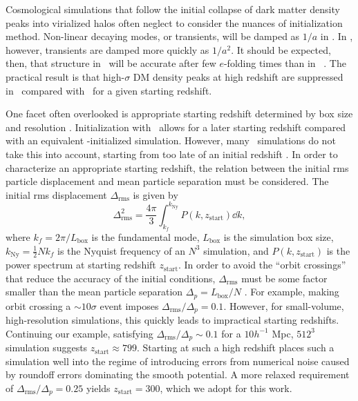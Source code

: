 

Cosmological simulations that follow the initial collapse of dark matter density peaks into virialized halos often neglect to consider the nuances of initialization method.  Non-linear decaying modes, or transients, will be damped as $1 / a$ in \za.  In \lpt, however, transients are damped more quickly as $1 / a^{2}$.  It should be expected, then, that structure in \lpt\ will be accurate after few $e$-folding times than in \za\ \citep{1998MNRAS.299.1097S, 2006MNRAS.373..369C, 2010MNRAS.403.1859J}.  The practical result is that high-$\sigma$ DM density peaks at high redshift are suppressed in \za\ compared with \lpt\ for a given starting redshift.

One facet often overlooked is appropriate starting redshift determined by box size and resolution \citep{2007ApJ...671.1160L}.  Initialization with \lpt\ allows for a later starting redshift compared with an equivalent \za-initialized simulation.  However, many \za\ simulations do not take this into account, starting from too late of an initial redshift \citep{2006MNRAS.373..369C, 2010MNRAS.403.1859J}.  In order to characterize an appropriate starting redshift, the relation between the initial rms particle displacement and mean particle separation must be considered.  The initial rms displacement $\Delta_{\mathrm{rms}}$ is given by
\begin{equation}
	\Delta_{\mathrm{rms}}^{2} = \frac{4 \pi}{3} \int_{k_{f}}^{k_{\mathrm{Ny}}} P(k, z_{\mathrm{start}}) \dd k,
\end{equation}
where $k_{f} = 2 \pi / L_{\mathrm{box}}$ is the fundamental mode, $L_{\mathrm{box}}$ is the simulation box size, $k_{\mathrm{Ny}} = \frac{1}{2} N k_{f}$ is the Nyquist frequency of an $N^{3}$ simulation, and $P(k, z_{\mathrm{start}})$ is the power spectrum at starting redshift $z_{\mathrm{start}}$.  In order to avoid the ``orbit crossings'' that reduce the accuracy of the initial conditions, $\Delta_{\mathrm{rms}}$ must be some factor smaller than the mean particle separation $\Delta_{p} = L_{\mathrm{box}} / N$ \citep{2012ApJ...761L...8H}.  For example, making orbit crossing a $\sim 10 \sigma$ event imposes $\Delta_{\mathrm{rms}} / \Delta_{p} = 0.1$.  However, for small-volume, high-resolution simulations, this quickly leads to impractical starting redshifts.  Continuing our example, satisfying $\Delta_{\mathrm{rms}} / \Delta_{p} \sim 0.1$ for a $10 h^{-1}$ Mpc, $512^{3}$ simulation suggests $z_{\mathrm{start}} \approx 799$.  Starting at such a high redshift places such a simulation well into the regime of introducing errors from numerical noise caused by roundoff errors dominating the smooth potential.  A more relaxed requirement of $\Delta_{\mathrm{rms}} / \Delta_{p} = 0.25$ yields $z_{\mathrm{start}} = 300$, which we adopt for this work.




